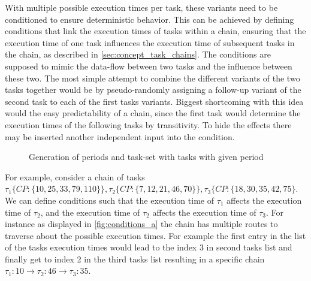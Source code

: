 With multiple possible execution times per task, these variants need to be conditioned to ensure deterministic behavior.
This can be achieved by defining conditions that link the execution times of tasks within a chain, ensuring that the execution time of one task influences the execution time of subsequent tasks in the chain, as described in \cref{sec:concept_task_chains}.
The conditions are supposed to mimic the data-flow between two tasks and the influence between these two.
The most simple attempt to combine the different variants of the two tasks together would be by pseudo-randomly assigning a follow-up variant of the second task to each of the first tasks variants.
Biggest shortcoming with this idea would the easy predictability of a chain, since the first task would determine the execution times of the following tasks by transitivity.
To hide the effects there may be inserted another independent input into the condition.


\begin{figure}[ht]
		\resizebox{\textwidth}{!}{%
			\label{fig:conditions_a}
			
		}
	\caption{Generation of periods and task-set with tasks with given period}
\end{figure}

For example, consider a chain of tasks \( \tau_1 \{ CP: \{10,25,33,79,110\}\}, \tau_2 \{ CP: \{7,12,21,46,70\}\}, \tau_3 \{CP: \{18,30,35,42,75\} \).
We can define conditions such that the execution time of \( \tau_1 \) affects the execution time of \( \tau_2 \), and the execution time of \( \tau_2 \) affects the execution time of \( \tau_3 \). 
For instance as displayed in \cref{fig:conditions_a} the chain has multiple routes to traverse about the possible execution times.
For example the first entry in the list of the tasks execution times would lead to the index 3 in second tasks list and finally get to index 2 in the third tasks list resulting in a specific chain \( \tau_1: 10 \rightarrow \tau_2: 46 \rightarrow \tau_3: 35 \).

